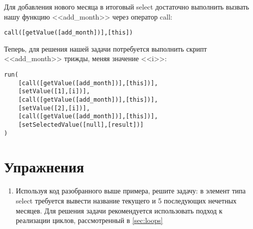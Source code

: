 \documentclass[../index.tex]{subfiles}
\begin{document}
Для добавления нового месяца в итоговый select достаточно выполнить вызвать нашу функцию <<add\_month>> через оператор call: 

\begin{verbatim}
call([getValue([add_month])],[this])
\end{verbatim}

Теперь, для решения нашей задачи потребуется выполнить скрипт <<add\_month>> трижды, меняя значение <<i>>:

\begin{verbatim}
run(
    [call([getValue([add_month])],[this])],
    [setValue([1],[i])],
    [call([getValue([add_month])],[this])],
    [setValue([2],[i])],
    [call([getValue([add_month])],[this])],
    [setSelectedValue([null],[result])]
)
\end{verbatim}
\section{Упражнения}
    \begin{enumerate}
        \item Используя код разобранного выше примера, решите задачу: в элемент типа select требуется вывести название текущего и 5 последующих нечетных месяцев. Для решения задачи рекомендуется использовать подход к реализации циклов, рассмотренный в  \autoref{sec:loops}            
    \end{enumerate}
\end{document}
